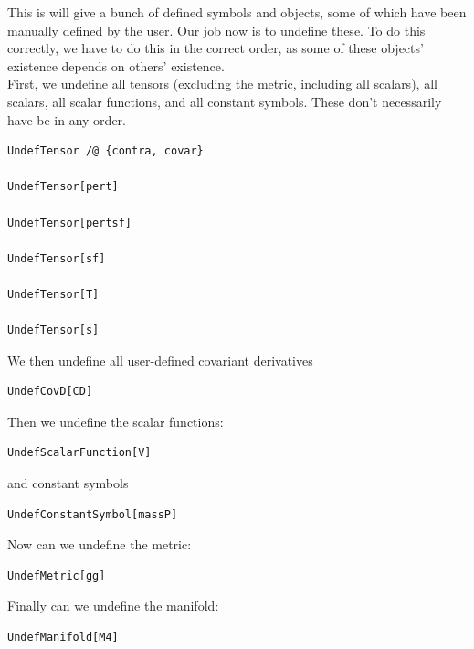 \documentclass{book}
\theoremstyle{definition}
\begin{document}
This is will give a bunch of defined symbols and objects, some of which have been manually defined by the user. Our job now is to undefine these. To do this correctly, we have to do this in the correct order, as some of these objects' existence depends on others' existence. \\

First, we undefine all tensors (excluding the metric, including all scalars), all scalars, all scalar functions, and all constant symbols. These don't necessarily have be in any order.
\begin{lstlisting}
UndefTensor /@ {contra, covar}

UndefTensor[pert]

UndefTensor[pertsf]

UndefTensor[sf]

UndefTensor[T]

UndefTensor[s]
\end{lstlisting}

We then undefine all user-defined covariant derivatives
\begin{lstlisting}
UndefCovD[CD]
\end{lstlisting}

Then we undefine the scalar functions:
\begin{lstlisting}
UndefScalarFunction[V]
\end{lstlisting}
and constant symbols
\begin{lstlisting}
UndefConstantSymbol[massP]
\end{lstlisting}

Now can we undefine the metric:
\begin{lstlisting}
UndefMetric[gg]
\end{lstlisting}

Finally can we undefine the manifold:
\begin{lstlisting}
UndefManifold[M4]
\end{lstlisting}
\end{document}
